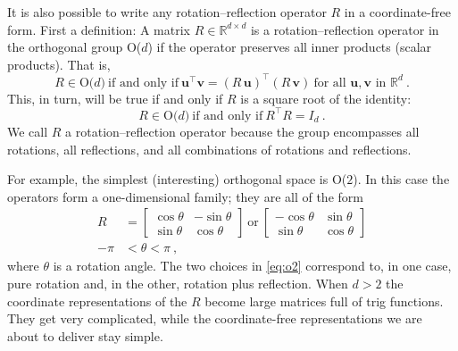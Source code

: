 \documentclass{article}
\newcommand{\Evec}[1]{{\mathbf{#1}}} %
\begin{document}
It is also possible to write any rotation--reflection operator $R$ in a coordinate-free form.
First a definition: A matrix $R\in\mathbb{R}^{d\times d}$ is a rotation--reflection operator in the orthogonal group O($d$) if the operator preserves all inner products (scalar products).
That is,
\begin{equation}
    R \in \mbox{O($d$)} ~ \mbox{if and only if} ~ \Evec{u}^\top\Evec{v}=(R\,\Evec{u})^\top(R\,\Evec{v}) ~ \mbox{for all $\Evec{u},\Evec{v}$ in $\mathbb{R}^d$} ~.\label{eq:orth1}
\end{equation}
This, in turn, will be true if and only if $R$ is a square root of the identity:
\begin{equation}
    R \in \mbox{O($d$)} ~ \mbox{if and only if} ~ R^\top R=I_d ~.\label{eq:orth2}
\end{equation}
We call $R$ a rotation--reflection operator because the group encompasses all rotations, all reflections, and all combinations of rotations and reflections.

For example, the simplest (interesting) orthogonal space is O($2$). In this case the operators form a one-dimensional family; they are all of the form
\begin{align}
    R &= \begin{bmatrix}\cos{\theta} & -\sin{\theta} \\ \sin{\theta} & \cos{\theta}\end{bmatrix} ~\mbox{or}~
    \begin{bmatrix}-\cos{\theta} & \sin{\theta} \\ \sin{\theta} & \cos{\theta}\end{bmatrix} \label{eq:o2}
    \\
    -\pi &< \theta < \pi ~, \nonumber
\end{align}
where $\theta$ is a rotation angle.
The two choices in \eqref{eq:o2} correspond to, in one case, pure rotation and, in the other, rotation plus reflection.
When $d>2$ the coordinate representations of the $R$ become large matrices full of trig functions.
They get very complicated, while the coordinate-free representations we are about to deliver stay simple.
\end{document}
